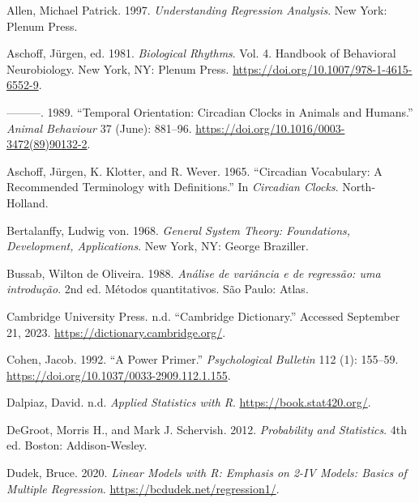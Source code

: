 \documentclass[
  12pt,
  a4paper,
  oneside]{tesesusp}
\newlength{\cslhangindent}
\newlength{\cslentryspacingunit} %
\newenvironment{CSLReferences}[2] %
 {%
  \setlength{\parindent}{0pt}
  \ifodd #1
  \let\oldpar\par
  \def\par{\hangindent=\cslhangindent\oldpar}
  \fi
  \setlength{\parskip}{#2\cslentryspacingunit}
 }%
 {}
\begin{document}
\hypertarget{refs}{}
\begin{CSLReferences}{1}{0}
\leavevmode{}%
Allen, Michael Patrick. 1997. \emph{Understanding Regression Analysis}.
New York: Plenum Press.

\leavevmode{}%
Aschoff, Jürgen, ed. 1981. \emph{Biological Rhythms}. Vol. 4. Handbook
of Behavioral Neurobiology. New York, NY: Plenum Press.
\url{https://doi.org/10.1007/978-1-4615-6552-9}.

\leavevmode{}%
---------. 1989. {``Temporal Orientation: Circadian Clocks in Animals
and Humans.''} \emph{Animal Behaviour} 37 (June): 881--96.
\url{https://doi.org/10.1016/0003-3472(89)90132-2}.

\leavevmode{}%
Aschoff, Jürgen, K. Klotter, and R. Wever. 1965. {``Circadian
Vocabulary: A Recommended Terminology with Definitions.''} In
\emph{Circadian Clocks}. North-Holland.

\leavevmode{}%
Bertalanffy, Ludwig von. 1968. \emph{General System Theory: Foundations,
Development, Applications}. New York, NY: George Braziller.

\leavevmode{}%
Bussab, Wilton de Oliveira. 1988. \emph{Análise de variância e de
regressão: uma introdução}. 2nd ed. Métodos quantitativos. São Paulo:
Atlas.

\leavevmode{}%
Cambridge University Press. n.d. {``Cambridge Dictionary.''} Accessed
September 21, 2023. \url{https://dictionary.cambridge.org/}.

\leavevmode{}%
Cohen, Jacob. 1992. {``A Power Primer.''} \emph{Psychological Bulletin}
112 (1): 155--59. \url{https://doi.org/10.1037/0033-2909.112.1.155}.

\leavevmode{}%
Dalpiaz, David. n.d. \emph{Applied Statistics with R}.
\url{https://book.stat420.org/}.

\leavevmode{}%
DeGroot, Morris H., and Mark J. Schervish. 2012. \emph{Probability and
Statistics}. 4th ed. Boston: Addison-Wesley.

\leavevmode{}%
Dudek, Bruce. 2020. \emph{Linear Models with R: Emphasis on 2-IV Models:
Basics of Multiple Regression}. \url{https://bcdudek.net/regression1/}.


\end{CSLReferences}
\end{document}
